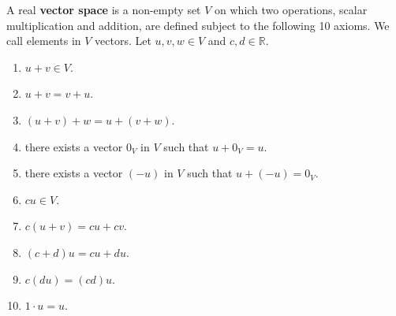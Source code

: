 \begin{defn}
A real {\bf vector space} is a non-empty set $V$ on which two operations, scalar multiplication and addition, are defined subject to the following 10 axioms. We call elements in $V$ vectors. Let $u,v,w \in V$ and $c,d\in \mathbb{R}$.
\begin{enumerate}
\item $u+v \in V$.
\item $u+v=v+u$.
\item $(u+v)+w=u+(v+w)$.
\item there exists a vector $0_{V}$ in $V$ such that $u+0_{V}=u$.
\item there exists a vector $(-u)$ in $V$ such that $u+(-u)=0_{V}$.
\item $cu \in V$.
\item $c(u+v)=cu+cv$.
\item $(c+d)u=cu+du$.
\item $c(du)=(cd)u$.
\item $1\cdot u =u$.
\end{enumerate}
\end{defn}

